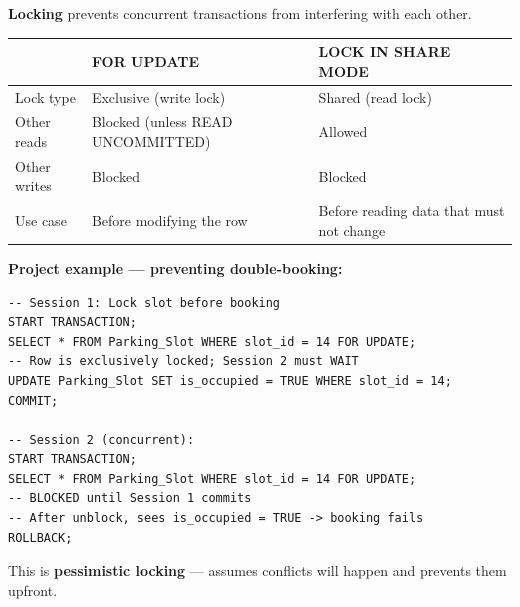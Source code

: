 \documentclass[12pt,a4paper]{article}
\begin{document}
\begin{questionbox}
\end{questionbox}
\begin{answerbox}
\textbf{Locking} prevents concurrent transactions from interfering with each other.

\begin{longtable}{@{}lp{5cm}p{5cm}@{}}
\toprule
& \textbf{FOR UPDATE} & \textbf{LOCK IN SHARE MODE} \\
\midrule
Lock type & Exclusive (write lock) & Shared (read lock) \\
Other reads & Blocked (unless READ UNCOMMITTED) & Allowed \\
Other writes & Blocked & Blocked \\
Use case & Before modifying the row & Before reading data that must not change \\
\bottomrule
\end{longtable}

\textbf{Project example --- preventing double-booking:}
\begin{lstlisting}
-- Session 1: Lock slot before booking
START TRANSACTION;
SELECT * FROM Parking_Slot WHERE slot_id = 14 FOR UPDATE;
-- Row is exclusively locked; Session 2 must WAIT
UPDATE Parking_Slot SET is_occupied = TRUE WHERE slot_id = 14;
COMMIT;

-- Session 2 (concurrent):
START TRANSACTION;
SELECT * FROM Parking_Slot WHERE slot_id = 14 FOR UPDATE;
-- BLOCKED until Session 1 commits
-- After unblock, sees is_occupied = TRUE -> booking fails
ROLLBACK;
\end{lstlisting}

This is \textbf{pessimistic locking} --- assumes conflicts will happen and prevents them upfront.
\end{answerbox}
\end{document}
